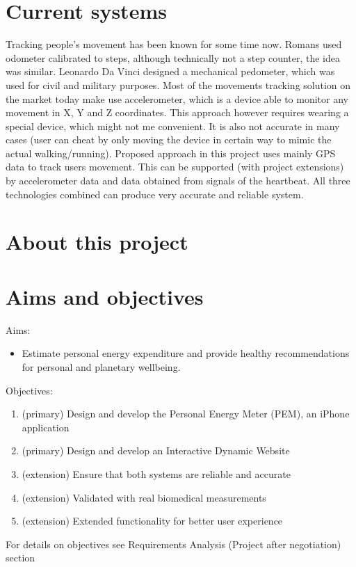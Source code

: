 \documentclass[12pt, a4paper]{report}   %
\begin{document}
\section{Current systems}
Tracking people’s movement has been known for some time now. Romans used odometer calibrated to steps, although technically not a step counter, the idea was similar. Leonardo Da Vinci designed a mechanical pedometer, which was used for civil and military purposes. Most of the movements tracking solution on the market today make use accelerometer, which is a device able to monitor any movement in X, Y and Z coordinates. This approach however requires wearing a special device, which might not me convenient. It is also not accurate in many cases (user can cheat by only moving the device in certain way to mimic the actual walking/running).
Proposed approach in this project uses mainly GPS data to track users movement. This can be supported (with project extensions) by accelerometer data and data obtained from signals of the heartbeat. All three technologies combined can produce very accurate and reliable system.

\section{About this project}

\section{Aims and objectives}
Aims:
\begin{itemize}
\item Estimate personal energy expenditure and provide healthy recommendations for personal and planetary wellbeing.
\end{itemize}
Objectives:
\begin{enumerate}
\item (primary) Design and develop the Personal Energy Meter (PEM), an iPhone application
\item (primary) Design and develop an Interactive Dynamic Website
\item (extension) Ensure that both systems are reliable and accurate
\item (extension) Validated with real biomedical measurements
\item (extension) Extended functionality for better user experience
\end{enumerate}
For details on objectives see Requirements Analysis (Project after negotiation) section
\end{document}
